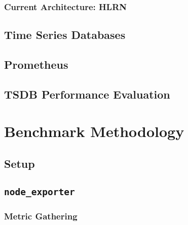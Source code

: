 \subsubsection{Current Architecture: HLRN}
\subsection{Time Series Databases}
\subsection{Prometheus}
\subsection{TSDB Performance Evaluation}

\section{Benchmark Methodology}
\subsection{Setup}
\subsection{\texttt{node\_exporter}}
\subsubsection{Metric Gathering}
